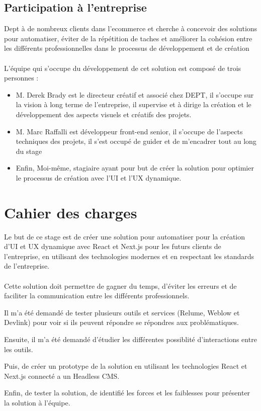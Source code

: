 \subsection{Participation à l'entreprise}

Dept à de nombreux clients dans l'ecommerce et cherche à concevoir des solutions pour automatiser, éviter de la répétition de taches et améliorer la cohésion entre les différents professionnelles dans le processus de développement et de création
\\ \\
L’équipe qui s’occupe du développement de cet solution est composé de trois personnes : 
\begin{itemize}
    \item M. Derek Brady est le directeur créatif et associé chez DEPT, il s'occupe sur la vision à long terme de l'entreprise, il supervise et à dirige la création et le développement des aspects visuels et créatifs des projets.
    \item M. Marc Raffalli est développeur front-end senior, il s'occupe de l'aspects techniques des projets, il s'est occupé de guider et de m'encadrer tout au long du stage
    \item Enfin, Moi-même, stagiaire ayant pour but de créer la solution pour optimier le processus de création avec l'UI et l'UX dynamique.
\end{itemize}

\section{Cahier des charges}
Le but de ce stage est de créer une solution pour automatiser pour la création d'UI et UX dynamique avec React et Next.js pour les futurs clients de l'entreprise, en utilisant des technologies modernes et en respectant les standards de l'entreprise. 
\\ \\
Cette solution doit permettre de gagner du temps, d'éviter les erreurs et de faciliter la communication entre les différents professionnels.

Il m'a été demandé de tester plusieurs outils et services (Relume, Weblow et Devlink) pour voir si ils peuvent répondre se répondres aux problématiques.

Ensuite, il m'a été demandé d'étudier les différentes possiblité d'interactions entre les outils. 

Puis, de créer un prototype de la solution en utilisant les technologies React et Next.js connecté a un Headless CMS.

Enfin, de tester la solution, de identifié les forces et les faiblesses pour présenter la solution à l'équipe.


